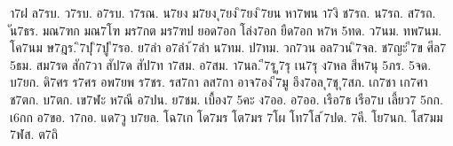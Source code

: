 {า7ฝ
ล7รบ.
ว7รบ.
อ7รบ.
า7รณ.
น7ยง
ม7ยง
ุ7ยง
ิ7ยง
ิ7ยน
หา7พน
า7งิ
ช7รถ.
น7รถ.
ส7รถ.
ัน7ธร.
มณ7ฑก
มณ7โฑ
มร7กต
มร7ฑป
ยอด7อก
โล่ง7อก
ยืด7อก
ห7ห
5ทด.
ว7นม.
ทพ7นม.
โค7นม
ษ7ฎร.
ิ7ปุ
ิ7ปู
ี7รอ.
ย7ลำ
อ7ลำ
้7ลำ
น7ทม.
ป7ทม.
วก7วน
อล7วน
ิ7จล.
ช7ญะ
ี7ข
ศีล7
5ธม.
สม7รด
สัก7วา
สัป7ด
สัป7ท
า7สม.
อ7สม.
า7นล.
ี7รุ
ู7รุ
เน7รุ
ง7หล
สีห7นุ
5ภร.
5จด.
บ7ยก.
ดิ7ศร
ร7ศร
อพ7ยพ
ร7ชร.
รส7กา
ลส7กา
อาจ7อง
ี7มู
อึง7อล
ุ7ชุ
ุ7สภ.
เก7ชา
เก7ศา
ช7ตก.
บ7ตก.
เข7ฬะ
ห7ณี
อ7ปน.
ย7ชม.
เบื้อง7
5คะ
ง7ออ.
อ7ออ.
เรือ7ธ
เรือ7บ
เลี้ยว7
5กก.
เ6กก
อ7ขอ.
า7กอ.
แด7วู
บ7ยล.
โฉ7เก
โด7มร
โต7มร
7โผ
โท7โส
้7ปด.
7คี.
โย7นก.
โส7มม
7ฬส.
ต7ถิ
}
